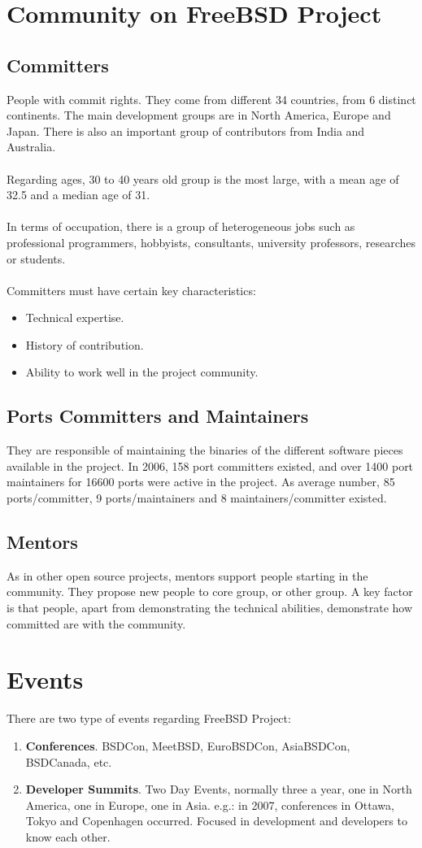 \documentclass[11pt]{article}
\begin{document}
\section{Community on FreeBSD Project}
\subsection{Committers} 
People with commit rights. They come from different 34 countries, from 6 distinct continents. The main development groups are in North America, Europe and Japan. There is also an important group of contributors from India and Australia.\\
\\
Regarding ages, 30 to 40 years old group is the most large, with a mean age of 32.5 and a median age of 31.\\
\\
In terms of occupation, there is a group of heterogeneous jobs such as professional programmers, hobbyists, consultants, university professors, researches or students.\\
\\
Committers must have certain key characteristics:
\begin{itemize}\itemsep0pt
\item{Technical expertise}.
\item{History of contribution}.
\item{Ability to work well in the project community}.
\end{itemize}
\subsection{Ports Committers and Maintainers} 
They are responsible of maintaining the binaries of the different software pieces available in the project.
In 2006, 158 port committers existed, and over 1400 port maintainers for 16600 ports were active in the project. As average number, 85 ports/committer, 9 ports/maintainers and 8 maintainers/committer existed.
\subsection{Mentors} 
As in other open source projects, mentors support people starting in the community.
They propose new people to core group, or other group. A key factor is that people, apart from demonstrating the technical abilities, demonstrate how committed are with the community.
\section{Events}
There are two type of events regarding FreeBSD Project:
\begin{enumerate}\itemsep0pt
\item{\textbf{Conferences}}. BSDCon, MeetBSD, EuroBSDCon, AsiaBSDCon, BSDCanada, etc.
\item{\textbf{Developer Summits}}. Two Day Events, normally three a year, one in North America, one in Europe, one in Asia. e.g.: in 2007, conferences in Ottawa, Tokyo and Copenhagen occurred. Focused in development and developers to know each other.
\end{enumerate}
\end{document}
